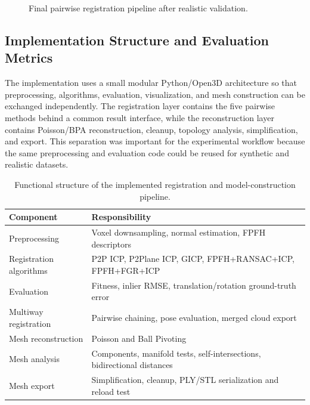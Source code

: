 \begin{figure}[!t]
\centering
{}
\caption{Final pairwise registration pipeline after realistic validation.}
\label{fig:final-ransac-pipeline}
\end{figure}

\subsection{Implementation Structure and Evaluation Metrics}
\label{sec:marvin-implementation-metrics}

The implementation uses a small modular Python/Open3D architecture so that preprocessing, algorithms, evaluation, visualization, and mesh construction can be exchanged independently. The registration layer contains the five pairwise methods behind a common result interface, while the reconstruction layer contains Poisson/BPA reconstruction, cleanup, topology analysis, simplification, and export. This separation was important for the experimental workflow because the same preprocessing and evaluation code could be reused for synthetic and realistic datasets.

\begin{table}[!t]
\centering
\footnotesize
\setlength{\tabcolsep}{3pt}
\begin{tabularx}{\columnwidth}{@{}lY@{}}
\toprule
\textbf{Component} & \textbf{Responsibility} \\
\midrule
Preprocessing & Voxel downsampling, normal estimation, FPFH descriptors \\
Registration algorithms & P2P ICP, P2Plane ICP, GICP, FPFH+RANSAC+ICP, FPFH+FGR+ICP \\
Evaluation & Fitness, inlier RMSE, translation/rotation ground-truth error \\
Multiway registration & Pairwise chaining, pose evaluation, merged cloud export \\
Mesh reconstruction & Poisson and Ball Pivoting \\
Mesh analysis & Components, manifold tests, self-intersections, bidirectional distances \\
Mesh export & Simplification, cleanup, PLY/STL serialization and reload test \\
\bottomrule
\end{tabularx}
\caption{Functional structure of the implemented registration and model-construction pipeline.}
\label{tab:software-structure}
\end{table}

